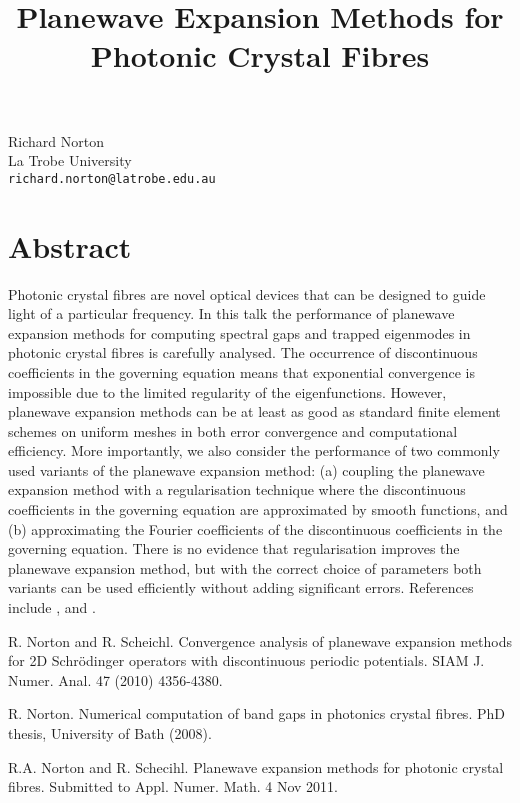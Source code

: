 \title{Planewave Expansion Methods for Photonic Crystal Fibres}
\author{}  \institute{}
\maketitle
\begin{center}
{\large Richard Norton}\\
La Trobe University\\
{\tt richard.norton@latrobe.edu.au}

\end{center}

\section*{Abstract}

Photonic crystal fibres are novel optical devices that can be designed to guide light of a particular frequency. In this talk the performance of planewave expansion methods for computing spectral gaps and trapped eigenmodes in photonic crystal fibres is carefully analysed. The occurrence of discontinuous coefficients in the governing equation means that exponential convergence is impossible due to the limited regularity of the eigenfunctions.  However, planewave expansion methods can be at least as good as standard finite element schemes on uniform meshes in both error convergence and computational efficiency.  More importantly, we also consider the performance of two commonly used variants of the planewave expansion method: (a) coupling the planewave expansion method with a regularisation technique where the discontinuous coefficients in the governing equation are approximated by smooth functions, and (b) approximating the Fourier coefficients of the discontinuous coefficients in the governing equation. There is no evidence that regularisation improves the planewave expansion method, but with the correct choice of parameters both variants can be used efficiently without adding significant errors.  References include \cite{nortonsinum}, \cite{nortonthesis} and \cite{nortonapnum}.



\begin{thebibliography}{10}

{\sc R. Norton and R. Scheichl}. {Convergence analysis of planewave expansion methods for 2D Schr\"{o}dinger operators with discontinuous periodic potentials}. SIAM J. Numer. Anal. 47 (2010) 4356-4380.



{\sc R. Norton}. {Numerical computation of band gaps in photonics crystal fibres}. PhD thesis, University of Bath (2008).



{\sc R.A. Norton and R. Schecihl}. {Planewave expansion methods for photonic crystal fibres}. Submitted to Appl. Numer. Math. 4 Nov 2011.

\end{thebibliography}

